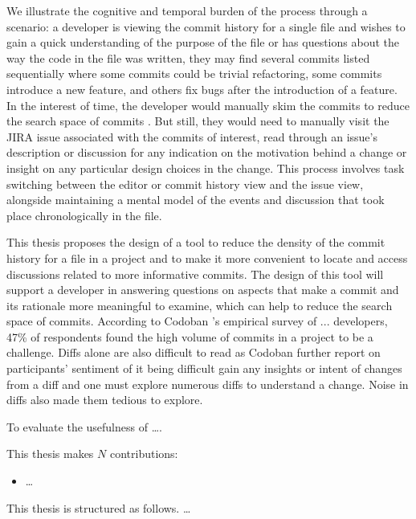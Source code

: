 We illustrate the cognitive and temporal burden of the process through a scenario: a developer is viewing the commit history for a single file and wishes to gain a quick understanding of the purpose of the file or has questions about the way the code in the file was written, they may find several commits listed sequentially where some commits could be trivial refactoring, some commits introduce a new feature, and others fix bugs after the introduction of a feature. 
In the interest of time, the developer would manually skim the commits to reduce the search space of commits \cite{codoban_software_2015}. 
But still, they would need to manually visit the JIRA issue associated with the commits of interest, read through an issue's description or discussion for any indication on the motivation behind a change or insight on any particular design choices in the change.
This process involves task switching between the editor or commit history view and the issue view, alongside maintaining a mental model of the events and discussion that took place chronologically in the file.

This thesis proposes the design of a tool to reduce the density of the commit history for a file in a project and to make it more convenient to locate and access discussions related to more informative commits. 
The design of this tool will support a developer in answering questions on aspects that make a commit and its rationale more meaningful to examine, which can help to reduce the search space of commits. 
According to Codoban \etal 's \cite{codoban_software_2015} empirical survey of ... developers, 47\% of respondents found the high volume of commits in a project to be a challenge. 
Diffs alone are also difficult to read as Codoban \etal \cite{codoban_software_2015} further report on participants' sentiment of it being difficult gain any insights or intent of changes from a diff and one must explore numerous diffs to understand a change. Noise in diffs also made them tedious to explore. 

To evaluate the usefulness of \dots .

This thesis makes $N$ contributions:
\begin{itemize}
	\item \dots
\end{itemize}

This thesis is structured as follows. \dots

\endinput

Any text after an \endinput is ignored.
You could put scraps here or things in progress.
